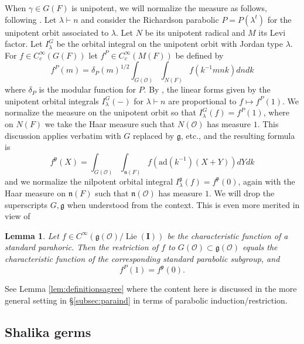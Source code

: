 \documentclass{amsart}
\numberwithin{equation}{section}
\newtheorem{lemma}{Lemma}[section]
\theoremstyle{definition}
\DeclareMathOperator{\Lie}{Lie}
\newcommand{\cO}{\mathcal{O}}
\newcommand{\fn}{\mathfrak{n}}
\newcommand{\fp}{\mathfrak{p}}
\newcommand{\fg}{\mathfrak{g}}
\newcommand{\bP}{\mathbf{P}}
\newcommand{\bI}{\mathbf{I}}
\begin{document}
When $\gamma\in G(F)$ is unipotent, we will normalize the measure as follows, following \cite{W1, H74}. Let $\lambda\vdash n$ and consider the Richardson parabolic $P=P(\lambda^t)$ for the unipotent orbit associated to $\lambda$. Let $N$ be its unipotent radical and $M$ its Levi factor. Let $I_{\lambda}^G$ be the orbital integral on the unipotent orbit with Jordan type $\lambda$. For $f\in C_c^\infty(G(F))$ let $f^P\in C_c^\infty(M(F))$ be defined by
\begin{equation}
\label{eq:constantterm}
f^P(m)=\delta_P(m)^{1/2}\int_{G(\cO)}\int_{N(F)} f(k^{-1}mnk)dndk
\end{equation}
where $\delta_P$ is the modular function for $P$.
By \cite[Proposition 5]{H74}, the linear forms given by the unipotent orbital integrals $I^G_\lambda(-)$ for $\lambda\vdash n$ are proportional to $f\mapsto f^P(1)$. We normalize the measure on the unipotent orbit so that $I^G_\lambda(f)=f^P(1)$, where on $N(F)$ we take the Haar measure such that $N(\cO)$ has measure $1$.
This discussion applies verbatim with $G$ replaced by $\fg$, etc., and the resulting formula is
\begin{equation}
\label{eq:constanttermLie}
f^{\fp}(X)=\int_{G(\cO)}\int_{\fn(F)}f(\mathrm{ad}(k^{-1})(X+Y))dYdk
\end{equation}
and %
we normalize the nilpotent orbital integral $I^{\fg}_\lambda(f)=f^{\fp}(0)$, again with the Haar measure on $\fn(F)$ such that $\fn(\cO)$ has measure $1$. We will drop the superscripts $G, \fg$ when understood from the context. This is even more merited in view of 
\begin{lemma}
    \label{lem:equalityofintegrals}
    Let $f\in C^\infty(\fg(\cO)/\Lie(\bI))$ be the characteristic function of a standard parahoric.
    Then the restriction of $f$ to $G(\cO)\subset \fg(\cO)$ equals the characteristic function of the corresponding standard parabolic subgroup, and $$f^P(1)=f^{\fp}(0).$$ %
\end{lemma}

See Lemma \ref{lem:definitionsagree} where the content here is discussed in the more general setting in \S\ref{subsec:paraind} in terms of parabolic induction/restriction.


\subsection{Shalika germs}\label{subsec:shalikasubsec}
\end{document}
